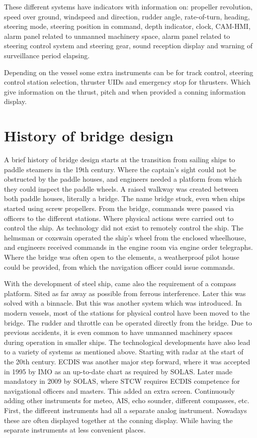 These different systems have indicators with information on: propeller revolution, speed over ground, windspeed and direction, rudder angle, rate-of-turn, heading, steering mode, steering position in command, depth indicator, clock, \ac{CAM-HMI}, alarm panel related to unmanned machinery space, alarm panel related to steering control system and steering gear, sound reception display and warning of surveillance period elapsing. 

Depending on the vessel some extra instruments can be for track control, steering control station selection, thruster \ac{UID}s and emergency stop for thrusters. Which give information on the thrust, pitch and when provided a conning information display. \cite{DNVGL2017}



\section{History of bridge design}
A brief history of bridge design starts at the transition from sailing ships to paddle steamers in the 19th century. Where the captain's sight could not be obstructed by the paddle houses, and engineers needed a platform from which they could inspect the paddle wheels. A raised walkway was created between both paddle houses, literally a bridge. The name bridge stuck, even when ships started using screw propellers. From the bridge, commands were passed via officers to the different stations. Where physical actions were carried out to control the ship. As technology did not exist to remotely control the ship. The helmsman or coxswain operated the ship's wheel from the enclosed wheelhouse, and engineers received commands in the engine room via engine order telegraphs. Where the bridge was often open to the elements, a weatherproof pilot house could be provided, from which the navigation officer could issue commands.

With the development of steel ship, came also the requirement of a compass platform. Sited as far away as possible from ferrous interference. Later this was solved with a binnacle. But this was another system which was introduced. In modern vessels, most of the stations for physical control have been moved to the bridge. The rudder and throttle can be operated directly from the bridge. Due to previous accidents, it is even common to have unmanned machinery spaces during operation in smaller ships. The technological developments have also lead to a variety of systems as mentioned above. Starting with radar at the start of the 20th century. \ac{ECDIS} was another major step forward, where it was accepted in 1995 by IMO as an up-to-date chart as required by \ac{SOLAS}. Later made mandatory in 2009 by \ac{SOLAS}, where \ac{STCW} requires \ac{ECDIS} competence for navigational officers and masters. This added an extra screen. Continuously adding other instruments for meteo, \ac{AIS}, echo sounder, different compasses, etc. First, the different instruments had all a separate analog instrument. Nowadays these are often displayed together at the conning display. While having the separate instruments at less convenient places.

